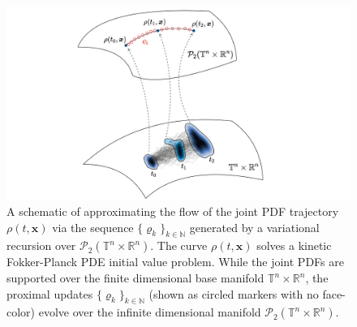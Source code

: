 \documentclass[10pt,twocolumn]{IEEEtran}
\begin{document}
\begin{figure}[tb]
\centering
\includegraphics[width=0.9\linewidth]{ProxSchmatic.pdf}
\caption{\small{A schematic of approximating the flow of the joint PDF trajectory $\rho(t,\bm{x})$ via the sequence $\{\varrho_{k}\}_{k\in\mathbb{N}}$ generated by a variational recursion over $\mathcal{P}_{2}\left(\mathbb{T}^{n}\times\mathbb{R}^{n}\right)$. The curve $\rho(t,\bm{x})$ solves a kinetic Fokker-Planck PDE initial value problem. While the joint PDFs are supported over the finite dimensional base manifold $\mathbb{T}^{n}\times\mathbb{R}^{n}$, the proximal updates $\{\varrho_{k}\}_{k\in\mathbb{N}}$ (shown as circled markers with no face-color) evolve over the infinite dimensional manifold $\mathcal{P}_{2}\left(\mathbb{T}^{n}\times\mathbb{R}^{n}\right)$.}}
\vspace*{-0.1in}
\label{fig:ProxSchematic}
\end{figure}
\end{document}
